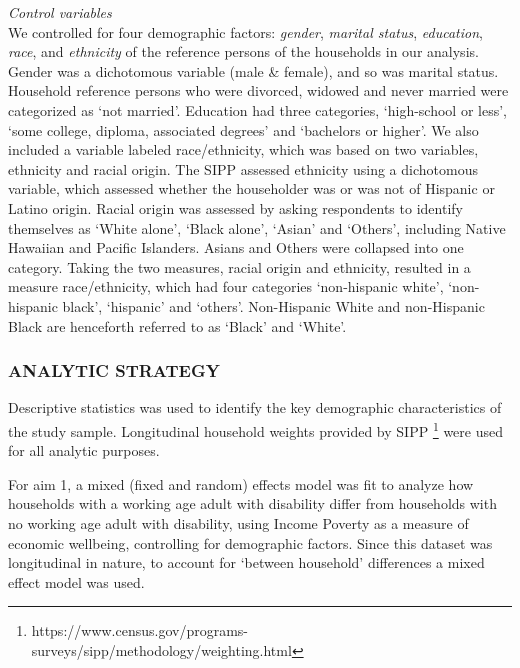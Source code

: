 \documentclass[11pt]{extarticle} %
\begin{document}
\noindent
{\emph{Control variables}}\\
We controlled for four demographic factors: {\emph{gender}}, {\emph{marital status}}, {\emph{education}}, {\emph{race}}, and {\emph{ethnicity}} of the reference persons of the households in our analysis. Gender was a dichotomous variable (male \& female), and so was marital status. Household reference persons who were divorced, widowed and never married were categorized as `not
married'. Education had three categories, `high-school or less', `some college, diploma, associated degrees' and `bachelors or higher'. We also included a variable labeled race/ethnicity, which was
based on two variables, ethnicity and racial origin. The SIPP assessed ethnicity using a dichotomous variable, which assessed whether the householder was or was not of Hispanic or
Latino origin. Racial origin was assessed by asking respondents to identify themselves as `White alone', `Black alone', `Asian' and `Others', including Native Hawaiian and Pacific Islanders. Asians
and Others were collapsed into one category. Taking the two measures, racial origin and ethnicity, resulted in a measure race/ethnicity, which had four categories `non-hispanic white', `non-hispanic black', `hispanic' and `others'. Non-Hispanic White and non-Hispanic Black are henceforth referred to as `Black' and `White'. 

\subsubsection*{ANALYTIC STRATEGY}
Descriptive statistics was used to identify the key demographic characteristics of the study sample. Longitudinal household weights provided by SIPP \footnote{https://www.census.gov/programs-surveys/sipp/methodology/weighting.html} were used for all analytic purposes. 

For aim 1, a mixed (fixed and random) effects model was fit to analyze how households with a working age adult with disability differ from households with no working age adult with disability, using Income Poverty as a measure of economic wellbeing, controlling for demographic factors. Since this dataset was longitudinal in nature, to account for `between household' differences a mixed effect model was used. 
\end{document}
